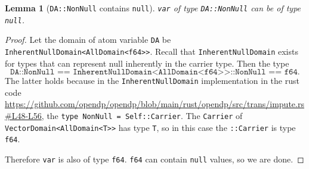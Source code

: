 \documentclass[11pt,a4paper]{article}
\newtheorem{lemma}[theorem]{Lemma}
\begin{document}
\begin{lemma}[\texttt{DA::NonNull} contains \texttt{null}] \label{lemma-NonNull}
\texttt{var} of type \texttt{DA::NonNull} can be of type \texttt{null}.
\end{lemma}
\begin{proof}
Let the domain of atom variable \texttt{DA} be \texttt{InherentNullDomain<AllDomain<f64>>}. Recall that \texttt{InherentNullDomain} exists for types that can represent null inherently in the carrier type. Then the type $$\texttt{DA::NonNull == InherentNullDomain<AllDomain<f64>>::NonNull == f64}.$$ The latter holds because in the \texttt{InherentNullDomain} implementation in the rust code \url{https://github.com/opendp/opendp/blob/main/rust/opendp/src/trans/impute.rs#L48-L56}, the \texttt{type NonNull = Self::Carrier}. The \texttt{Carrier} of \texttt{VectorDomain<AllDomain<T>>} has type \texttt{T}, so in this case the \texttt{::Carrier} is type \texttt{f64}.

Therefore \texttt{var} is also of type \texttt{f64}. \texttt{f64} can contain \texttt{null} values, so we are done.
\end{proof}
\end{document}
